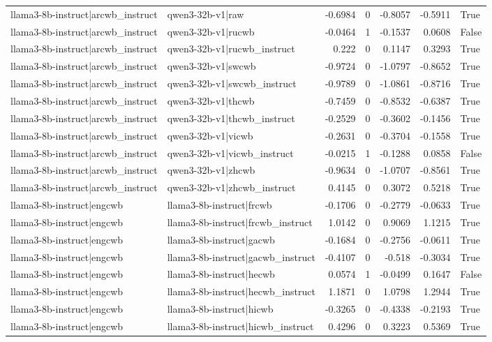 \begin{table}
\begin{tabular}{l l r r r r l}
llama3-8b-instruct|arcwb_instruct & qwen3-32b-v1|raw & -0.6984 & 0 & -0.8057 & -0.5911 & True \\
llama3-8b-instruct|arcwb_instruct & qwen3-32b-v1|rucwb & -0.0464 & 1 & -0.1537 & 0.0608 & False \\
llama3-8b-instruct|arcwb_instruct & qwen3-32b-v1|rucwb_instruct & 0.222 & 0 & 0.1147 & 0.3293 & True \\
llama3-8b-instruct|arcwb_instruct & qwen3-32b-v1|swcwb & -0.9724 & 0 & -1.0797 & -0.8652 & True \\
llama3-8b-instruct|arcwb_instruct & qwen3-32b-v1|swcwb_instruct & -0.9789 & 0 & -1.0861 & -0.8716 & True \\
llama3-8b-instruct|arcwb_instruct & qwen3-32b-v1|thcwb & -0.7459 & 0 & -0.8532 & -0.6387 & True \\
llama3-8b-instruct|arcwb_instruct & qwen3-32b-v1|thcwb_instruct & -0.2529 & 0 & -0.3602 & -0.1456 & True \\
llama3-8b-instruct|arcwb_instruct & qwen3-32b-v1|vicwb & -0.2631 & 0 & -0.3704 & -0.1558 & True \\
llama3-8b-instruct|arcwb_instruct & qwen3-32b-v1|vicwb_instruct & -0.0215 & 1 & -0.1288 & 0.0858 & False \\
llama3-8b-instruct|arcwb_instruct & qwen3-32b-v1|zhcwb & -0.9634 & 0 & -1.0707 & -0.8561 & True \\
llama3-8b-instruct|arcwb_instruct & qwen3-32b-v1|zhcwb_instruct & 0.4145 & 0 & 0.3072 & 0.5218 & True \\
llama3-8b-instruct|engcwb & llama3-8b-instruct|frcwb & -0.1706 & 0 & -0.2779 & -0.0633 & True \\
llama3-8b-instruct|engcwb & llama3-8b-instruct|frcwb_instruct & 1.0142 & 0 & 0.9069 & 1.1215 & True \\
llama3-8b-instruct|engcwb & llama3-8b-instruct|gacwb & -0.1684 & 0 & -0.2756 & -0.0611 & True \\
llama3-8b-instruct|engcwb & llama3-8b-instruct|gacwb_instruct & -0.4107 & 0 & -0.518 & -0.3034 & True \\
llama3-8b-instruct|engcwb & llama3-8b-instruct|hecwb & 0.0574 & 1 & -0.0499 & 0.1647 & False \\
llama3-8b-instruct|engcwb & llama3-8b-instruct|hecwb_instruct & 1.1871 & 0 & 1.0798 & 1.2944 & True \\
llama3-8b-instruct|engcwb & llama3-8b-instruct|hicwb & -0.3265 & 0 & -0.4338 & -0.2193 & True \\
llama3-8b-instruct|engcwb & llama3-8b-instruct|hicwb_instruct & 0.4296 & 0 & 0.3223 & 0.5369 & True \\

\end{tabular}
\end{table}
